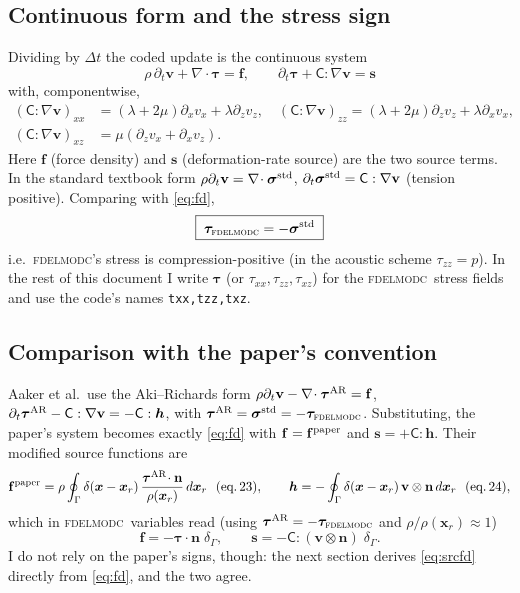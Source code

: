 \documentclass[11pt,a4paper]{article}
\newcommand{\vv}{\mathbf v}
\newcommand{\nn}{\mathbf n}
\newcommand{\ff}{\mathbf f}
\newcommand{\Cm}{\mathsf C}
\newcommand{\dd}{\partial}
\newcommand{\fd}{\textsc{fdelmodc}}
\begin{document}
\subsection{Continuous form and the stress sign}
Dividing by $\Delta t$ the coded update is the continuous system
\begin{equation}
\boxed{\;\rho\,\dd_t \vv+\nabla\!\cdot\bm\tau=\ff,\qquad
\dd_t\bm\tau+\Cm:\nabla\vv=\bm s\;}
\label{eq:fd}
\end{equation}
with, componentwise,
\[
\begin{aligned}
(\Cm:\nabla\vv)_{xx}&=(\lambda{+}2\mu)\dd_xv_x+\lambda\dd_zv_z,\quad
(\Cm:\nabla\vv)_{zz}=(\lambda{+}2\mu)\dd_zv_z+\lambda\dd_xv_x,\\
(\Cm:\nabla\vv)_{xz}&=\mu(\dd_zv_x+\dd_xv_z).
\end{aligned}
\]
Here $\ff$ (force density) and $\bm s$ (deformation-rate source) are the two
source terms. In the standard textbook form $\rho\dd_t\vv=\nabla\!\cdot\bm\sigma^{\rm std}$,
$\dd_t\bm\sigma^{\rm std}=\Cm:\nabla\vv$ (tension positive). Comparing with
\eqref{eq:fd},
\begin{equation}
\boxed{\;\bm\tau_{\fd}=-\bm\sigma^{\rm std}\;}
\end{equation}
i.e.\ \fd's stress is compression-positive (in the acoustic scheme $\tau_{zz}=p$).
In the rest of this document I write $\bm\tau$ (or $\tau_{xx},\tau_{zz},\tau_{xz}$)
for the \fd\ stress fields and use the code's names \texttt{txx,tzz,txz}.

\subsection{Comparison with the paper's convention}
Aaker et al.\ use the Aki--Richards form $\rho\dd_t\vv-\nabla\!\cdot\bm\tau^{\rm AR}=\ff$,
$\dd_t\bm\tau^{\rm AR}-\Cm:\nabla\vv=-\Cm:\bm h$, with $\bm\tau^{\rm AR}=\bm\sigma^{\rm std}=-\bm\tau_\fd$.
Substituting, the paper's system becomes exactly \eqref{eq:fd} with
$\ff=\ff^{\rm paper}$ and $\bm s=+\Cm:\bm h$. Their modified source functions are
\begin{equation}
\ff^{\rm paper}=\rho\oint_\Gamma\delta(\bm x-\bm x_r)\,\frac{\bm\tau^{\rm AR}\!\cdot\nn}{\rho(\bm x_r)}\,d\bm x_r\ \ (\text{eq.\,23}),\qquad
\bm h=-\oint_\Gamma\delta(\bm x-\bm x_r)\,\vv\otimes\nn\,d\bm x_r\ \ (\text{eq.\,24}),
\end{equation}
which in \fd\ variables read (using $\bm\tau^{\rm AR}=-\bm\tau_\fd$ and $\rho/\rho(\bm x_r)\approx1$)
\begin{equation}
\ff=-\bm\tau\!\cdot\nn\;\delta_\Gamma,\qquad
\bm s=-\Cm:(\vv\otimes\nn)\;\delta_\Gamma .
\label{eq:srcfd}
\end{equation}
I do not rely on the paper's signs, though: the next section derives
\eqref{eq:srcfd} directly from \eqref{eq:fd}, and the two agree.
\end{document}
